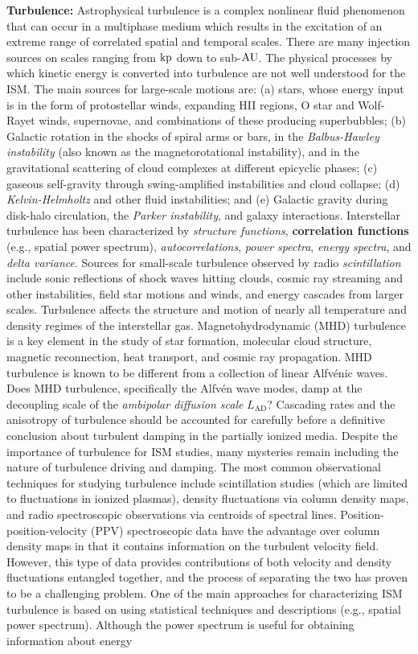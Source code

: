 \documentclass[a4paper,10pt]{article}
\begin{document}
{\noindent}\textbf{Turbulence:} Astrophysical turbulence is a complex nonlinear fluid phenomenon that can occur in a multiphase medium which results in the excitation of an extreme range of correlated spatial and temporal scales. There are many injection sources on scales ranging from ${\rm kp}$ down to sub-${\rm AU}$. The physical processes by which kinetic energy is converted into turbulence are not well understood for the ISM. The main sources for large-scale motions are: (a) stars, whose energy input is in the form of protostellar winds, expanding HII regions, O star and Wolf-Rayet winds, supernovae, and combinations of these producing superbubbles; (b) Galactic rotation in the shocks of spiral arms or bars, in the \textit{Balbus-Hawley instability} (also known as the magnetorotational instability), and in the gravitational scattering of cloud complexes at different epicyclic phases; (c) gaseous self-gravity through swing-amplified instabilities and cloud collapse; (d) \textit{Kelvin-Helmholtz} and other fluid instabilities; and (e) Galactic gravity during disk-halo circulation, the \textit{Parker instability}, and galaxy interactions. Interstellar turbulence has been characterized by \textit{structure functions}, \textbf{correlation functions} (e.g., spatial power spectrum), \textit{autocorrelations}, \textit{power spectra}, \textit{energy spectra}, and \textit{delta variance}. Sources for small-scale turbulence observed by radio \textit{scintillation} include sonic reflections of shock waves hitting clouds, cosmic ray streaming and other instabilities, field star motions and winds, and energy cascades from larger scales. Turbulence affects the structure and motion of nearly all temperature and density regimes of the interstellar gas. Magnetohydrodynamic (MHD) turbulence is a key element in the study of star formation, molecular cloud structure, magnetic reconnection, heat transport, and cosmic ray propagation. MHD turbulence is known to be different from a collection of linear Alfv\'enic waves. Does MHD turbulence, specifically the Alfv\'en wave modes, damp at the decoupling scale of the \textit{ambipolar diffusion scale} $L_\mathrm{AD}$? Cascading rates and the anisotropy of turbulence should be accounted for carefully before a definitive conclusion about turbulent damping in the partially ionized media. Despite the importance of turbulence for ISM studies, many mysteries remain including the nature of turbulence driving and damping. The most common observational techniques for studying turbulence include scintillation studies (which are limited to fluctuations in ionized plasmas), density fluctuations via column density maps, and radio spectroscopic observations via centroids of spectral lines. Position-position-velocity (PPV) spectroscopic data have the advantage over column density maps in that it contains information on the turbulent velocity field. However, this type of data provides contributions of both velocity and density fluctuations entangled together, and the process of separating the two has proven to be a challenging problem. One of the main approaches for characterizing ISM turbulence is based on using statistical techniques and descriptions (e.g., spatial power spectrum). Although the power spectrum is useful for obtaining information about energy 
\end{document}
